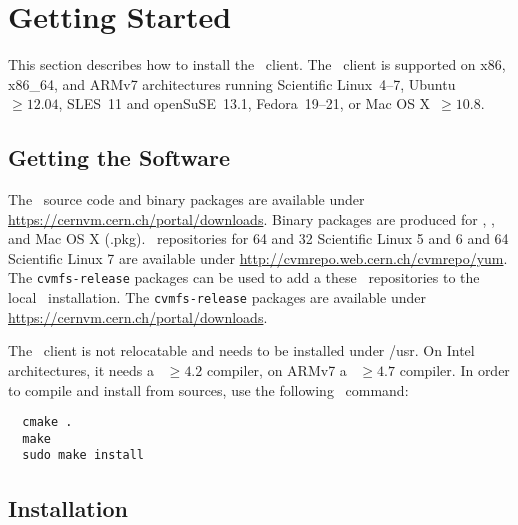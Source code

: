 \chapter{Getting Started}
\label{sct:start}

This section describes how to install the \cvmfs\ client.
The \cvmfs\ client is supported on x86, x86\_64, and ARMv7 architectures running Scientific Linux~4--7, Ubuntu~$\geq12.04$, SLES~11 and openSuSE~13.1, Fedora~19--21, or Mac OS X~$\geq 10.8$.

\section{Getting the Software}
The \cvmfs\ source code and binary packages are available under \url{https://cernvm.cern.ch/portal/downloads}.
Binary packages are produced for \rpm, \dpkg, and Mac OS X (.pkg).
\yum\ repositories for \SI{64}{\bit} and \SI{32}{\bit} Scientific Linux 5 and 6 and \SI{64}{\bit} Scientific Linux 7 are available under \url{http://cvmrepo.web.cern.ch/cvmrepo/yum}.
The \texttt{cvmfs-release} packages can be used to add a these \yum\ repositories to the local \yum\ installation.
The \texttt{cvmfs-release} packages are available under \url{https://cernvm.cern.ch/portal/downloads}.

The \cvmfs\ client is not relocatable and needs to be installed under /usr.
On Intel architectures, it needs a ~$\geq 4.2$ compiler, on ARMv7  a ~$\geq 4.7$ compiler.
In order to compile and install from sources, use the following \cmake\ command:
\begin{verbatim}
  cmake .
  make
  sudo make install
\end{verbatim}

\section{Installation}
